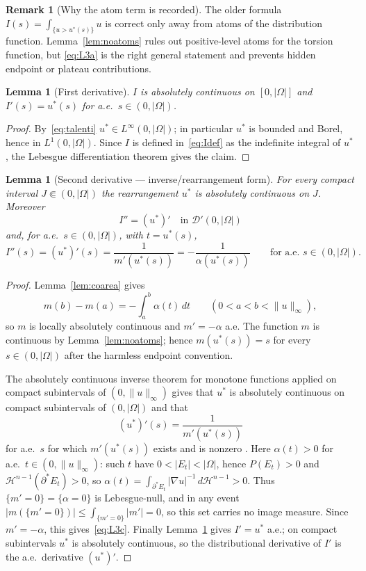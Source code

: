 \documentclass[11pt]{article}
\newtheorem{lemma}[theorem]{Lemma}
\theoremstyle{definition}
\newtheorem{remark}[theorem]{Remark}
\newcommand{\Om}{\Omega}
\begin{document}
\begin{remark}[Why the atom term is recorded]\label{rem:atom-aware}
The older formula $I(s)=\int_{\{u>u^*(s)\}}u$ is correct only away from
atoms of the distribution function.  Lemma~\ref{lem:noatoms} rules out
positive-level atoms for the torsion function, but \eqref{eq:L3a} is the
right general statement and prevents hidden endpoint or plateau
contributions.
\end{remark}

\begin{lemma}[First derivative]\label{lem:I3b}
$I$ is absolutely continuous on $[0,|\Om|]$ and $I'(s)=u^{*}(s)$ for
a.e.\ $s\in(0,|\Om|)$.
\end{lemma}

\begin{proof}
By~\eqref{eq:talenti} $u^{*}\in L^{\infty}(0,|\Om|)$; in particular
$u^{*}$ is bounded and Borel, hence in $L^{1}(0,|\Om|)$.  Since
$I$ is defined in~\eqref{eq:Idef} as the indefinite integral of $u^{*}$,
the Lebesgue differentiation theorem gives the claim.
\end{proof}

\begin{lemma}[Second derivative --- inverse/rearrangement form]\label{lem:I3c}
For every compact interval $J\Subset(0,|\Om|)$ the rearrangement $u^{*}$
is absolutely continuous on $J$.  Moreover
\[
   I''=(u^{*})'\quad\text{in }\mathcal D'(0,|\Om|)
\]
and, for a.e.\ $s\in(0,|\Om|)$, with $t=u^{*}(s)$,
\begin{equation}\label{eq:L3c}
   I''(s)=(u^{*})'(s)
   =\frac{1}{m'(u^{*}(s))}
   =-\frac{1}{\alpha(u^{*}(s))}
   \qquad\text{for a.e.\ }s\in(0,|\Om|).
\end{equation}
\end{lemma}

\begin{proof}
Lemma~\ref{lem:coarea} gives
\[
   m(b)-m(a)=-\int_a^b\alpha(t)\,dt
   \qquad(0<a<b<\|u\|_\infty),
\]
so $m$ is locally absolutely continuous and $m'=-\alpha$ a.e.  The
function $m$ is continuous by Lemma~\ref{lem:noatoms}; hence
$m(u^{*}(s))=s$ for every $s\in(0,|\Om|)$ after the harmless endpoint
convention.

The absolutely continuous inverse theorem for monotone functions applied
on compact subintervals of $(0,\|u\|_\infty)$ gives that $u^{*}$ is
absolutely continuous on compact subintervals of $(0,|\Om|)$ and that
\[
   (u^*)'(s)=\frac{1}{m'(u^*(s))}
\]
for a.e.\ $s$ for which $m'(u^*(s))$ exists and is nonzero
\cite[Thm.~0.4 and \S1]{BBC1975}.  Here $\alpha(t)>0$ for a.e.\
$t\in(0,\|u\|_\infty)$: such $t$ have $0<|E_t|<|\Om|$, hence $P(E_t)>0$
and $\mathcal H^{n-1}(\partial^{*}E_t)>0$, so
$\alpha(t)=\int_{\partial^{*}E_t}|\nabla u|^{-1}\,d\mathcal H^{n-1}>0$.
Thus $\{m'=0\}=\{\alpha=0\}$ is Lebesgue-null, and in any event
$|m(\{m'=0\})|\le\int_{\{m'=0\}}|m'|=0$, so this set carries no image
measure.  Since $m'=-\alpha$, this gives~\eqref{eq:L3c}.  Finally
Lemma~\ref{lem:I3b} gives $I'=u^*$ a.e.; on compact subintervals
$u^*$ is absolutely continuous, so the distributional derivative of
$I'$ is the a.e.\ derivative $(u^*)'$.
\end{proof}
\end{document}
